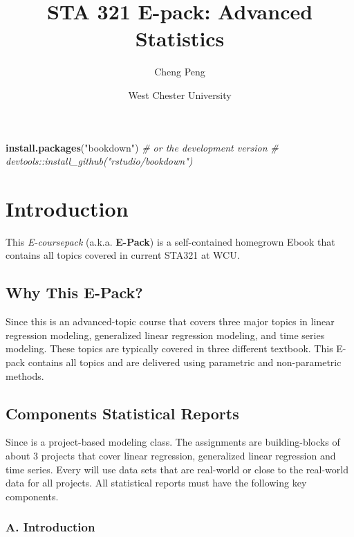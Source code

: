 \documentclass[
]{book}
\title{STA 321 E-pack: Advanced Statistics}
\author{Cheng Peng}
\date{West Chester University}
\newenvironment{Shaded}{\begin{snugshade}}{\end{snugshade}}
\newcommand{\CommentTok}[1]{\textcolor[rgb]{0.56,0.35,0.01}{\textit{#1}}}
\newcommand{\FunctionTok}[1]{\textcolor[rgb]{0.13,0.29,0.53}{\textbf{#1}}}
\newcommand{\NormalTok}[1]{#1}
\newcommand{\StringTok}[1]{\textcolor[rgb]{0.31,0.60,0.02}{#1}}
\begin{document}
\maketitle

{
\setcounter{tocdepth}{1}
\tableofcontents
}
\begin{Shaded}
\begin{Highlighting}[]
\FunctionTok{install.packages}\NormalTok{(}\StringTok{"bookdown"}\NormalTok{)}
\CommentTok{\# or the development version}
\CommentTok{\# devtools::install\_github("rstudio/bookdown")}
\end{Highlighting}
\end{Shaded}

\hypertarget{introduction}{%
\chapter{Introduction}\label{introduction}}

This \emph{E-coursepack} (a.k.a. \textbf{E-Pack}) is a self-contained homegrown Ebook that contains all topics covered in current STA321 at WCU.

\hypertarget{why-this-e-pack}{%
\section{Why This E-Pack?}\label{why-this-e-pack}}

Since this is an advanced-topic course that covers three major topics in linear regression modeling, generalized linear regression modeling, and time series modeling. These topics are typically covered in three different textbook. This E-pack contains all topics and are delivered using parametric and non-parametric methods.

\hypertarget{components-statistical-reports}{%
\section{Components Statistical Reports}\label{components-statistical-reports}}

Since is a project-based modeling class. The assignments are building-blocks of about 3 projects that cover linear regression, generalized linear regression and time series. Every will use data sets that are real-world or close to the real-world data for all projects. All statistical reports must have the following key components.

\hypertarget{a.-introduction}{%
\subsection*{A. Introduction}\label{a.-introduction}}
\end{document}
